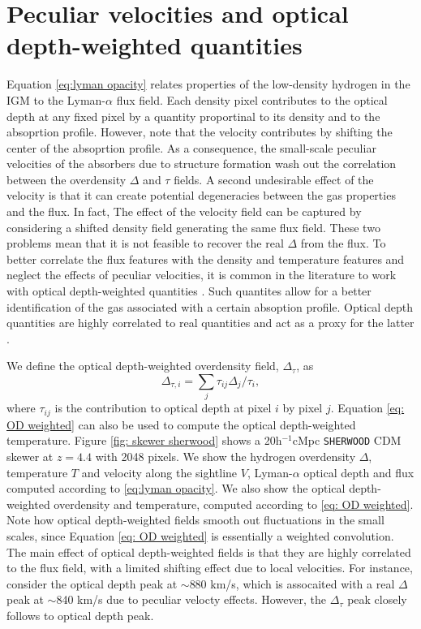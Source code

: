 \section{Peculiar velocities and optical depth-weighted quantities}\label{sec: optical depth weighted}
Equation \ref{eq:lyman opacity} relates properties of the low-density hydrogen in the IGM to the Lyman-$\alpha$ flux field. Each density pixel contributes to the optical depth at any fixed pixel by a quantity proportinal to its density and to the absoprtion profile. However, note that the velocity contributes by shifting the center of the absoprtion profile. As a consequence, the small-scale peculiar velocities of the absorbers due to structure formation wash out the correlation between the overdensity $\Delta$ and $\tau$ fields. A second undesirable effect of the velocity is that it can create potential degeneracies between the gas properties and the flux. In fact, The effect of the velocity field can be captured by considering a shifted density field generating the same flux field. These two problems mean that it is not feasible to recover the real $\Delta$ from the flux. To better correlate the flux features with the density and temperature features and neglect the effects of peculiar velocities, it is common in the literature to work with optical depth-weighted quantities \cite{_oltinsk__2021}. Such quantites allow for a better identification of the gas associated with a certain absoption profile. Optical depth quantities are highly correlated to real quantities and act as a proxy for the latter \cite{Schaye1999}.

We define the optical depth-weighted overdensity field, $\Delta_\tau$, as
\begin{equation}\label{eq: OD weighted}
        \Delta_{\tau,i}=\sum_j \tau_{ij} \Delta_j /\tau_i,
\end{equation}
where $\tau_{ij}$ is the contribution to optical depth at pixel $i$ by pixel $j$. Equation \ref{eq: OD weighted} can also be used to compute the optical depth-weighted temperature. Figure \ref{fig: skewer sherwood} shows a 20h$^{-1}$cMpc \texttt{SHERWOOD} CDM skewer at $z=4.4$ with 2048 pixels. We show the hydrogen overdensity $\Delta$, temperature $T$ and velocity along the sightline $V$, Lyman-$\alpha$ optical depth and flux computed according to \ref{eq:lyman opacity}. We also show the optical depth-weighted overdensity and temperature, computed according to \ref{eq: OD weighted}. Note how optical depth-weighted fields smooth out fluctuations in the small scales, since Equation \ref{eq: OD weighted} is essentially a weighted convolution. The main effect of optical depth-weighted fields is that they are highly correlated to the flux field, with a limited shifting effect due to local velocities. For instance, consider the optical depth peak at $\sim$880 km/s, which is assocaited with a real $\Delta$ peak at $\sim$840 km/s due to peculiar velocty effects. However, the $\Delta_\tau$ peak closely follows to optical depth peak.

